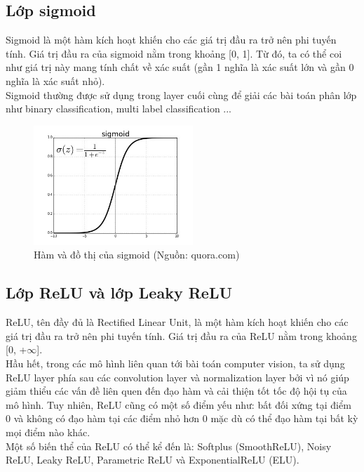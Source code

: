 {    \subsection{Lớp sigmoid}
    Sigmoid là một hàm kích hoạt khiến cho các giá trị đầu ra trở nên phi tuyến tính. Giá trị đầu ra của sigmoid nằm trong khoảng [0, 1]. Từ đó, ta có thể coi như giá trị này mang tính chất về xác suất (gần 1 nghĩa là xác suất lớn và gần 0 nghĩa là xác suất nhỏ).\\
    Sigmoid thường được sử dụng trong layer cuối cùng để giải các bài toán phân lớp như binary classification, multi label classification ...

    \begin{figure}[H]
    \centering
    \includegraphics[width=6cm] {images/sigmoid.jpeg}
    \caption{Hàm và đồ thị của sigmoid (Nguồn: quora.com)}
    \label{fig:sigmoid}
    \end{figure}

    \subsection{Lớp ReLU và lớp Leaky ReLU}
    ReLU, tên đầy đủ là Rectified Linear Unit, là một hàm kích hoạt khiến cho các giá trị đầu ra trở nên phi tuyến tính. Giá trị đầu ra của ReLU nằm trong khoảng [0, +$\infty$].\\
    Hầu hết, trong các mô hình liên quan tới bài toán computer vision, ta sử dụng ReLU layer phía sau các convolution layer và normalization layer bởi vì nó giúp giảm thiểu các vấn đề liên quen đến đạo hàm và cải thiện tốt tốc độ hội tụ của mô hình. Tuy nhiên, ReLU cũng có một số điểm yếu như: bất đối xứng tại điểm 0 và không có đạo hàm tại các điểm nhỏ hơn 0 mặc dù có thể đạo hàm tại bất kỳ mọi điểm nào khác.\\
    Một số biến thể của ReLU có thể kể đến là: Softplus (SmoothReLU), Noisy ReLU, Leaky ReLU, Parametric ReLU và ExponentialReLU (ELU).
    
}
